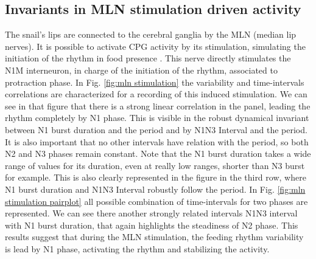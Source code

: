 \subsection{Invariants in MLN stimulation driven activity}
The snail's lips are connected to the cerebral ganglia by the MLN (median lip nerves). It is possible to activate CPG activity by its stimulation, simulating the initiation of the rhythm in food presence \parencite{staras_electrophysiological_1999}. This nerve directly stimulates the N1M interneuron, in charge of the initiation of the rhythm, associated to protraction phase. In Fig. \ref{fig:mln stimulation} the variability and time-intervals correlations are characterized for a recording of this induced stimulation. We can see in that figure that there is a strong linear correlation in the panel, leading the rhythm completely by N1 phase. This is visible in the robust dynamical invariant between N1 burst duration and the period and by N1N3 Interval and the period. It is also important that no other intervals have relation with the period, so both N2 and N3 phases remain constant. Note that the N1 burst duration takes a wide range of values for its duration, even at really low ranges, shorter than N3 burst for example. This is also clearly represented in the figure in the third row, where N1 burst duration and N1N3 Interval robustly follow the period. 
In Fig. \ref{fig:mln stimulation pairplot} all possible combination of time-intervals for two phases are represented. We can see there another strongly related intervals N1N3 interval with N1 burst duration, that again highlights the steadiness of N2 phase. 
This results suggest that during the MLN stimulation, the feeding rhythm variability is lead by N1 phase, activating the rhythm and stabilizing the activity. 


